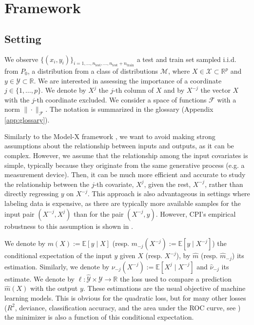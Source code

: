 \documentclass{article}
\theoremstyle{plain}
\theoremstyle{definition}
\theoremstyle{remark}
\begin{document}
\section{Framework}
\subsection{Setting}\label{subsec:setting}
We observe $\{(x_i, y_i)\}_{i=1, \ldots, n_\mathrm{test}, \ldots, n_\mathrm{test} + n_\mathrm{train}}$ a test and train set  sampled i.i.d. from $P_0$, a distribution from a class of distributions $\mathcal{M}$, where $X \in \mathcal{X}\subset \mathbb{R}^p$ and $y\in \mathcal{Y}\subset \mathbb{R}$. We are interested in assessing the importance of a coordinate $j\in\{1, \ldots, p\}$. 
%
We denote by $X^j$ the $j$-th column of $X$ and by $X^{-j}$ the vector $X$ with the $j$-th coordinate excluded. 
%
%
We consider a space of functions $\mathcal{F}$ with a norm $\|\cdot\|_\mathcal{F}$. The notation is summarized in the glossary (Appendix \ref{app:glossary}). 


Similarly to the Model-X framework \citep{barber-candes2015,candes2017panninggoldmodelxknockoffs}, we want to avoid making strong assumptions about the relationship between inputs and outputs, as it can be complex. However, we assume that the relationship among the input covariates is simple, typically because they originate from the same generative process (e.g. a measurement device). 
%
%
Then, it can be much more efficient and accurate to study the relationship between the $j$-th covariate, $X^j$, given the rest, $X^{-j}$, rather than directly regressing $y$ on $X^{-j}$. This approach is also advantageous in settings where labeling data is expensive, as there are typically more available samples for the input pair $(X^{-j}, X^j)$ than for the pair $(X^{-j}, y)$. However, CPI’s empirical robustness to this assumption is shown in \cite{paillard2025measuringvariableimportanceheterogeneous}.


We denote by $m(X) := \mathbb{E}[y\mid X]$ (resp. $m_{-j}(X^{-j}) := \mathbb{E}[y\mid X^{-j}]$) the conditional expectation of the input $y$ given $X$ (resp. $X^{-j}$), by $\widehat{m}$ (resp. $\widehat{m}_{-j}$) its estimation.  Similarly, we denote by $\nu_{-j}(X^{-j}) := \mathbb{E}[X^j\mid X^{-j}]$ and $\widehat{\nu}_{-j}$ its estimate. We denote by $\ell : \widehat{\mathcal{Y}} \times \mathcal{Y} \to \mathbb{R}$ the loss used to compare a prediction $\widehat{m}(X)$ with the output $y$. 
%
These estimations are the usual objective of machine learning models. This is obvious for the quadratic loss, but for many other losses ($R^2$, deviance, classification accuracy, and the area under the ROC curve, see  \citet{williamson2023general}) the minimizer is also a function of this conditional expectation.
\end{document}
